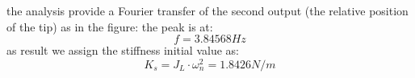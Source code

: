             the analysis provide a Fourier transfer of the second output (the relative position of the tip) as in the figure:
            the peak is at:
            \[
                f = 3.84568 Hz\]
            as result we assign the stiffness initial value as:
            \[
                    K_s = J_L \cdot \omega_n^2 = 1.8426 N/m \]

            
            
            
            
        

                
                








